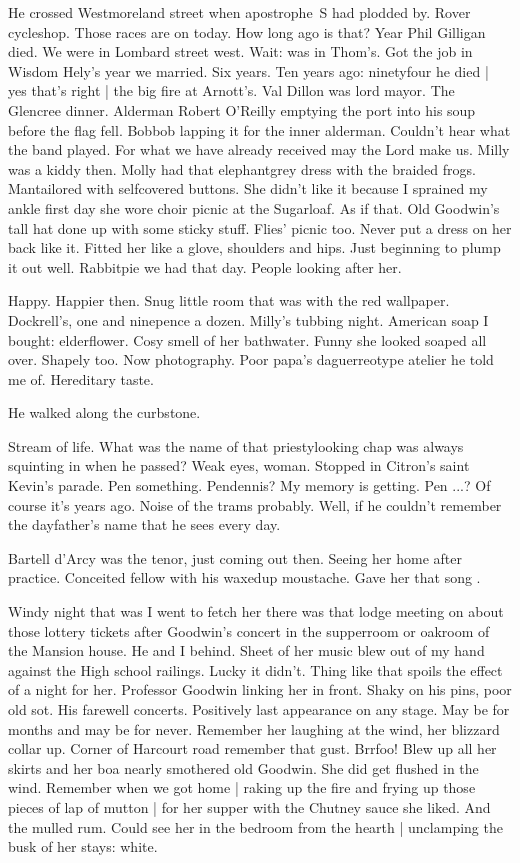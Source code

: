 He crossed Westmoreland street
when apostrophe~S had plodded by.
Rover cycleshop.
Those races are on today.
How long ago is that?
Year Phil Gilligan died.
We were in Lombard street west.
Wait:
was in Thom's.
Got the job in Wisdom Hely's year we married.
Six years.
Ten years ago:
ninetyfour he died |
yes that's right |
the big fire at Arnott's.
Val Dillon was lord mayor.
The Glencree dinner.
Alderman Robert O'Reilly emptying the port into his soup
before the flag fell.
Bobbob lapping it for the inner alderman.
Couldn't hear what the band played.
For what we have already received may the Lord make us.
Milly was a kiddy then.
Molly had that elephantgrey dress with the braided frogs.
Mantailored with selfcovered buttons.
She didn't like it because I sprained my ankle
first day she wore
choir picnic at the Sugarloaf.
As if that.
Old Goodwin's tall hat done up with some sticky stuff.
Flies' picnic too.
Never put a dress on her back like it.
Fitted her like a glove,
shoulders and hips.
Just beginning to plump it out well.
Rabbitpie we had that day.
People looking after her.

Happy.
Happier then.
Snug little room that was with the red wallpaper.
Dockrell's, one and ninepence a dozen.
Milly's tubbing night.
American soap I bought:
elderflower.
Cosy smell of her bathwater.
Funny she looked soaped all over.
Shapely too.
Now photography.
Poor papa's daguerreotype atelier he told me of.
Hereditary taste.

He walked along the curbstone.

Stream of life.
What was the name of that priestylooking chap was always squinting in
when he passed?
Weak eyes, woman.
Stopped in Citron's
saint Kevin's parade.
Pen something.
Pendennis?
My memory is getting.
Pen ...?
Of course it's years ago.
Noise of the trams probably.
Well, if he couldn't remember the dayfather's name
that he sees every day.

Bartell d'Arcy was the tenor,
just coming out then.
Seeing her home after practice.
Conceited fellow with his waxedup moustache.
Gave her that song
.

Windy night that was I went to fetch her there
was that lodge meeting on about those lottery tickets
after Goodwin's concert in the supperroom or oakroom
of the Mansion house.
He and I behind.
Sheet of her music blew out of my hand against the High school railings.
Lucky it didn't.
Thing like that spoils the effect of a night for her.
Professor Goodwin linking her in front.
Shaky on his pins, poor old sot.
His farewell concerts.
Positively last appearance on any stage.
May be for months and may be for never.
Remember her laughing at the wind, her blizzard collar up.
Corner of Harcourt road remember that gust.
Brrfoo!
Blew up all her skirts and her boa nearly smothered old Goodwin.
She did get flushed in the wind.
Remember when we got home |
raking up the fire and frying up those pieces of lap of mutton |
for her supper with the Chutney sauce she liked.
And the mulled rum.
Could see her in the bedroom from the hearth |
unclamping the busk of her stays:
white.

